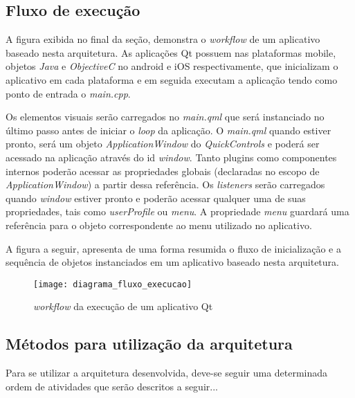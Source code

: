 \subsection{Fluxo de execução}\label{sec:solucao-desenvolvida}
A figura exibida no final da seção, demonstra o \textit{workflow} de um aplicativo baseado nesta arquitetura. As aplicações Qt possuem nas plataformas mobile, objetos \textit{Java} e \textit{ObjectiveC} no android e iOS respectivamente, que inicializam o aplicativo em cada plataforma e em seguida executam a aplicação tendo como ponto de entrada o \textit{main.cpp}.\par

Os elementos visuais serão carregados no \textit{main.qml} que será instanciado no último passo antes de iniciar o \textit{loop} da aplicação. O \textit{main.qml} quando estiver pronto, será um objeto \textit{ApplicationWindow} do \textit{QuickControls} e poderá ser acessado na aplicação através do id \textit{window}. Tanto plugins como componentes internos poderão acessar as propriedades globais (declaradas no escopo de \textit{ApplicationWindow}) a partir dessa referência. Os \textit{listeners} serão carregados quando \textit{window} estiver pronto e poderão acessar qualquer uma de suas propriedades, tais como \textit{userProfile} ou \textit{menu}. A propriedade \textit{menu} guardará uma referência para o objeto correspondente ao menu utilizado no aplicativo.

A figura a seguir, apresenta de uma forma resumida o fluxo de inicialização e a sequência de objetos instanciados em um aplicativo baseado nesta arquitetura.

\begin{figure}[H]
	\texttt{[image: diagrama\_fluxo\_execucao]}
	\centering
	\caption{\textit{workflow} da execução de um aplicativo Qt}
\end{figure}


\subsection{Métodos para utilização da arquitetura}
Para se utilizar a arquitetura desenvolvida, deve-se seguir uma determinada ordem de atividades que serão descritos a seguir...